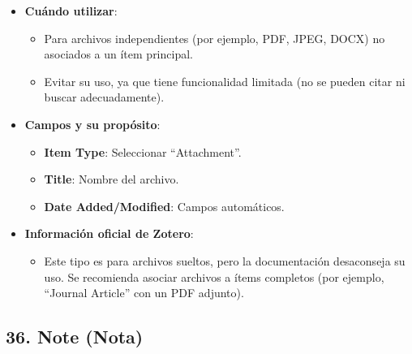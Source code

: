 \documentclass[
  jou,
  floatsintext,
  longtable,
  a4paper,
  nolmodern,
  notxfonts,
  notimes,
  colorlinks=true,linkcolor=blue,citecolor=blue,urlcolor=blue]{apa7}
\providecommand{\tightlist}{%
  \setlength{\itemsep}{0pt}\setlength{\parskip}{0pt}}
\begin{document}
\begin{itemize}
\tightlist
\item
  \textbf{Cuándo utilizar}:

  \begin{itemize}
  \tightlist
  \item
    Para archivos independientes (por ejemplo, PDF, JPEG, DOCX) no
    asociados a un ítem principal.
  \item
    Evitar su uso, ya que tiene funcionalidad limitada (no se pueden
    citar ni buscar adecuadamente).
  \end{itemize}
\item
  \textbf{Campos y su propósito}:

  \begin{itemize}
  \tightlist
  \item
    \textbf{Item Type}: Seleccionar ``Attachment''.
  \item
    \textbf{Title}: Nombre del archivo.
  \item
    \textbf{Date Added/Modified}: Campos automáticos.
  \end{itemize}
\item
  \textbf{Información oficial de Zotero}:

  \begin{itemize}
  \tightlist
  \item
    Este tipo es para archivos sueltos, pero la documentación
    desaconseja su uso. Se recomienda asociar archivos a ítems completos
    (por ejemplo, ``Journal Article'' con un PDF adjunto).
  \end{itemize}
\end{itemize}

\subsection{36. Note (Nota)}\label{note-nota}
\end{document}
